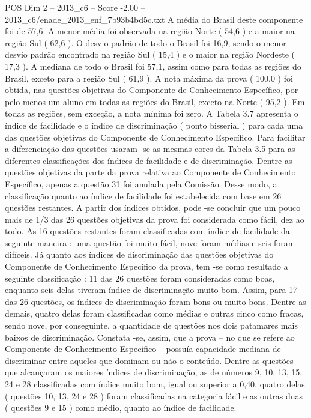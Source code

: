 \begin{textsample}{POS Dim 2 – 2013\_c6 – Score -2.00 – 2013\_c6/enade\_2013\_enf\_7b93b4bd5c.txt}
A média do Brasil deste componente foi de 57,6.
A menor média foi observada na região Norte ( 54,6 ) e a maior na região Sul ( 62,6 ).
O desvio padrão de todo o Brasil foi 16,9, sendo o menor desvio padrão encontrado na região Sul ( 15,4 ) e o maior na região Nordeste ( 17,3 ).
A mediana de todo o Brasil foi 57,1, assim como para todas as regiões do Brasil, exceto para a região Sul ( 61,9 ).
A nota máxima da prova ( 100,0 ) foi obtida, nas questões objetivas do Componente de Conhecimento Específico, por pelo menos um aluno em todas as regiões do Brasil, exceto na Norte ( 95,2 ).
Em todas as regiões, sem exceção, a nota mínima foi zero.
A Tabela 3.7 apresenta o índice de facilidade e o índice de discriminação ( ponto bisserial ) para cada uma das questões objetivas do Componente de Conhecimento Específico.
Para facilitar a diferenciação das questões usaram -se as mesmas cores da Tabela 3.5 para as diferentes classificações dos índices de facilidade e de discriminação.
Dentre as questões objetivas da parte da prova relativa ao Componente de Conhecimento Específico, apenas a questão 31 foi anulada pela Comissão.
Desse modo, a classificação quanto ao índice de facilidade foi estabelecida com base em 26 questões restantes.
A partir dos índices obtidos, pode -se concluir que um pouco mais de 1/3 das 26 questões objetivas da prova foi considerada como fácil, dez ao todo.
As 16 questões restantes foram classificadas com índice de facilidade da seguinte maneira : uma questão foi muito fácil, nove foram médias e seis foram difíceis.
Já quanto aos índices de discriminação das questões objetivas do Componente de Conhecimento Específico da prova, tem -se como resultado a seguinte classificação : 11 das 26 questões foram consideradas como boas, enquanto seis delas tiveram índice de discriminação muito bom.
Assim, para 17 das 26 questões, os índices de discriminação foram bons ou muito bons.
Dentre as demais, quatro delas foram classificadas como médias e outras cinco como fracas, sendo nove, por conseguinte, a quantidade de questões nos dois patamares mais baixos de discriminação.
Constata -se, assim, que a prova – no que se refere ao Componente de Conhecimento Específico – possuía capacidade mediana de discriminar entre aqueles que dominam ou não o conteúdo.
Dentre as questões que alcançaram os maiores índices de discriminação, as de números 9, 10, 13, 15, 24 e 28 classificadas com índice muito bom, igual ou superior a 0,40, quatro delas ( questões 10, 13, 24 e 28 ) foram classificadas na categoria fácil e as outras duas ( questões 9 e 15 ) como médio, quanto ao índice de facilidade.

\end{textsample}

